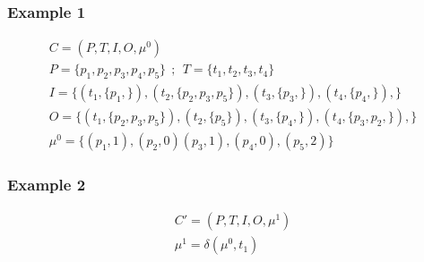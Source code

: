 \begin{frame}
    \frametitle{Example 1}
    \tikzset{node distance = 0.5cm and 0.5cm}
    \begin{figure}
        \centering
        \intropetrinet[black][black][0.6]{}
    \end{figure}
    \begin{gather*}
        C = (P,T,I,O, \mu^0)
        \\
        P = \{p_1, p_2, p_3, p_4, p_5\} ~ ~ ; ~ ~T = \{t_1, t_2, t_3, t_4\}
        \\
        I = \{(t_1, \{p_1,\}), (t_2, \{p_2, p_3, p_5\}),  (t_3, \{p_3,\}),  (t_4, \{p_4,\}),\}
        \\
        O = \{(t_1, \{p_2, p_3, p_5\}), (t_2, \{p_5\}),  (t_3, \{p_4,\}),  (t_4, \{p_3, p_2,\}),\}
        \\
        \mu^0 = \{(p_1, 1), (p_2, 0)  (p_3, 1),  (p_4, 0),  (p_5, 2) \}
    \end{gather*}
\end{frame}
\begin{frame}
    \frametitle{Example 2}
    \tikzset{node distance = 0.5cm and 0.5cm}
    \begin{figure}
        \centering
        \intropetrinetnext[black][black][0.6]{}
    \end{figure}
    \begin{gather*}
        C' = (P, T, I, O, \mu^1)
        \\
        \mu^1 = \delta(\mu^0, t_1)
    \end{gather*}
\end{frame}

